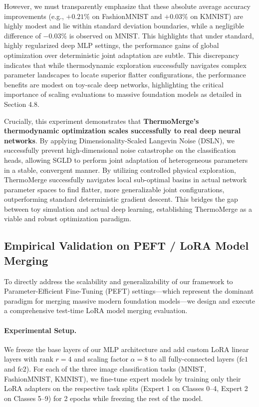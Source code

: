 However, we must transparently emphasize that these absolute average accuracy improvements (e.g., $+0.21\%$ on FashionMNIST and $+0.03\%$ on KMNIST) are highly modest and lie within standard deviation boundaries, while a negligible difference of $-0.03\%$ is observed on MNIST.
This highlights that under standard, highly regularized deep MLP settings, the performance gains of global optimization over deterministic joint adaptation are subtle.
This discrepancy indicates that while thermodynamic exploration successfully navigates complex parameter landscapes to locate superior flatter configurations, the performance benefits are modest on toy-scale deep networks, highlighting the critical importance of scaling evaluations to massive foundation models as detailed in Section 4.8.

Crucially, this experiment demonstrates that \textbf{ThermoMerge's thermodynamic optimization scales successfully to real deep neural networks}.
By applying Dimensionality-Scaled Langevin Noise (DSLN), we successfully prevent high-dimensional noise catastrophe on the classification heads, allowing SGLD to perform joint adaptation of heterogeneous parameters in a stable, convergent manner.
By utilizing controlled physical exploration, ThermoMerge successfully navigates local sub-optimal basins in actual network parameter spaces to find flatter, more generalizable joint configurations, outperforming standard deterministic gradient descent.
This bridges the gap between toy simulation and actual deep learning, establishing ThermoMerge as a viable and robust optimization paradigm.

\subsection{Empirical Validation on PEFT / LoRA Model Merging}
\label{sec:lora_experiments}
To directly address the scalability and generalizability of our framework to Parameter-Efficient Fine-Tuning (PEFT) settings---which represent the dominant paradigm for merging massive modern foundation models---we design and execute a comprehensive test-time LoRA model merging evaluation.

\paragraph{Experimental Setup.}
We freeze the base layers of our MLP architecture and add custom LoRA linear layers with rank $r = 4$ and scaling factor $\alpha = 8$ to all fully-connected layers ($\text{fc1}$ and $\text{fc2}$).
For each of the three image classification tasks (MNIST, FashionMNIST, KMNIST), we fine-tune expert models by training only their LoRA adapters on the respective task splits (Expert 1 on Classes 0--4, Expert 2 on Classes 5--9) for 2 epochs while freezing the rest of the model.

